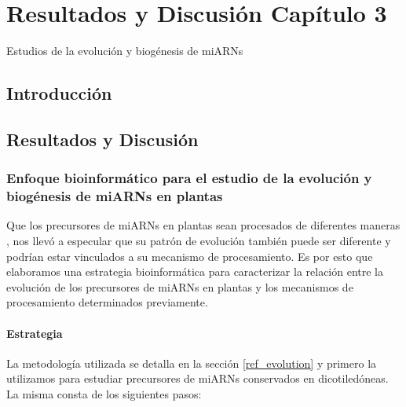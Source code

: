 \graphicspath{{Chapter3/Figs/}}

\setcounter{chapter}{6}
\chapter*{Resultados y Discusión Capítulo 3} 

{\LARGE Estudios de la evolución y biogénesis de miARNs}


\section{Introducción}


\section{Resultados y Discusión}


\subsection{Enfoque bioinformático para el estudio de la evolución y biogénesis de miARNs en plantas}

Que los precursores de miARNs en plantas sean procesados de diferentes maneras \citep{Bologna2013}, nos llevó a especular que su patrón de evolución también puede ser diferente y podrían estar vinculados a su mecanismo de procesamiento.
Es por esto que elaboramos una estrategia bioinformática para caracterizar la relación entre la evolución de los precursores de miARNs en plantas y los mecanismos de procesamiento determinados previamente.

\subsubsection{Estrategia}

La metodología utilizada se detalla en la sección \ref{ref_evolution} y primero la utilizamos para estudiar precursores de miARNs conservados en dicotiledóneas. 
La misma consta de los siguientes pasos:

